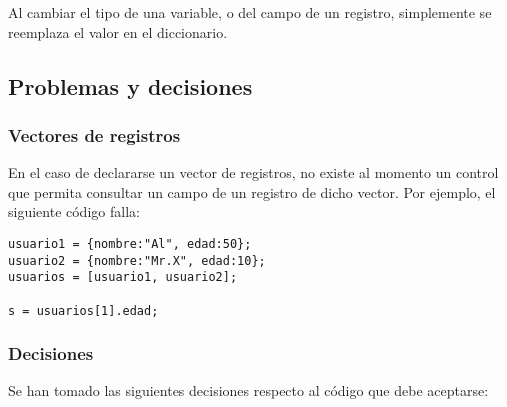 Al cambiar el tipo de una variable, o del campo de un registro, simplemente se reemplaza el valor en el diccionario.
%
%
%
%

\subsection{Problemas y decisiones}

\subsubsection{Vectores de registros}

En el caso de declararse un vector de registros, no existe al momento un control que permita consultar un campo de un registro de dicho vector. Por ejemplo, el siguiente código falla:

\begin{lstlisting}
usuario1 = {nombre:"Al", edad:50};
usuario2 = {nombre:"Mr.X", edad:10};
usuarios = [usuario1, usuario2];

s = usuarios[1].edad;
\end{lstlisting}

\subsubsection{Decisiones}
Se han tomado las siguientes decisiones respecto al código que debe aceptarse:

